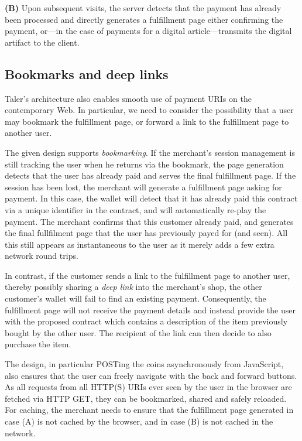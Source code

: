 \documentclass{llncs}
\begin{document}
{\bf (B)} Upon subsequent visits, the server detects that the payment
has already been processed and directly generates a fulfillment page
either confirming the payment, or---in the case of payments for a
digital article---transmits the digital artifact to the client.

\subsection{Bookmarks and deep links}

Taler's architecture also enables smooth use of payment
URIs on the contemporary Web.  In particular, we need to consider the
possibility that a user may bookmark the fulfillment page, or forward
a link to the fulfillment page to another user.

The given design supports {\em bookmarking}. If the merchant's
session management is still tracking the user when he returns via the
bookmark, the page generation detects that the user has already paid
and serves the final fulfillment page.  If the session has been lost,
the merchant will generate a fulfillment page asking for payment.  In
this case, the wallet will detect that it has already paid this
contract via a unique identifier in the contract, and will
automatically re-play the payment.  The merchant confirms that this
customer already paid, and generates the final fullfilment page that the
user has previously payed for (and seen).  All this still appears as
instantaneous to the user as it merely adds a few extra network round trips.

In contrast, if the customer sends a link to the fulfillment page to
another user, thereby possibly sharing a {\em deep link} into the
merchant's shop, the other customer's wallet will fail to find an
existing payment.  Consequently, the fulfillment page will not receive
the payment details and instead provide the user with the proposed
contract which contains a description of the item previously bought by
the other user. The recipient of the link can then decide to also
purchase the item.

The design, in particular POSTing the coins asyn\-chro\-nous\-ly from
JavaScript, also ensures that the user can freely navigate with
the back and forward buttons.  As all requests from all HTTP(S)
URIs ever seen by the user in the browser are fetched via HTTP
GET, they can be bookmarked, shared and safely reloaded.  For
caching, the merchant needs to ensure that the fulfillment
page generated in case (A) is not cached by the browser,
and in case (B) is not cached in the network.
\end{document}

